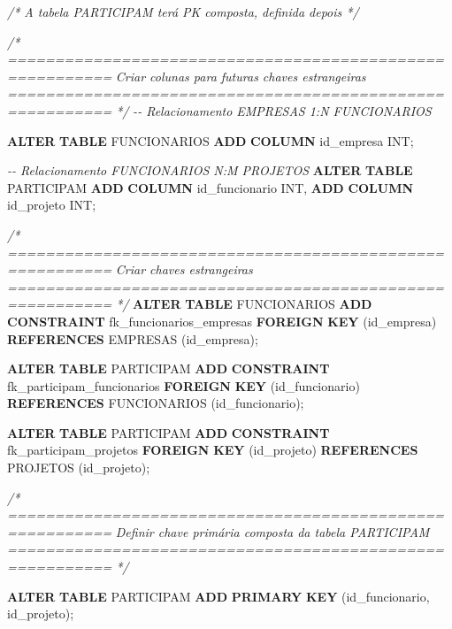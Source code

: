 \documentclass[
]{book}
\newenvironment{Shaded}{\begin{snugshade}}{\end{snugshade}}
\newcommand{\CommentTok}[1]{\textcolor[rgb]{0.56,0.35,0.01}{\textit{#1}}}
\newcommand{\DataTypeTok}[1]{\textcolor[rgb]{0.13,0.29,0.53}{#1}}
\newcommand{\KeywordTok}[1]{\textcolor[rgb]{0.13,0.29,0.53}{\textbf{#1}}}
\newcommand{\NormalTok}[1]{#1}
\begin{document}
\begin{Shaded}
\begin{Highlighting}[]
\CommentTok{/* A tabela PARTICIPAM terá PK composta, definida depois */}

\CommentTok{/* =========================================================}
\CommentTok{   Criar colunas para futuras chaves estrangeiras}
\CommentTok{   ========================================================= */}
\CommentTok{{-}{-} Relacionamento EMPRESAS 1:N FUNCIONARIOS}

\KeywordTok{ALTER} \KeywordTok{TABLE}\NormalTok{ FUNCIONARIOS  }\KeywordTok{ADD} \KeywordTok{COLUMN}\NormalTok{ id\_empresa }\DataTypeTok{INT}\NormalTok{;}

\CommentTok{{-}{-} Relacionamento FUNCIONARIOS N:M PROJETOS}
\KeywordTok{ALTER} \KeywordTok{TABLE}\NormalTok{ PARTICIPAM }\KeywordTok{ADD} \KeywordTok{COLUMN}\NormalTok{ id\_funcionario }\DataTypeTok{INT}\NormalTok{, }\KeywordTok{ADD} \KeywordTok{COLUMN}\NormalTok{ id\_projeto }\DataTypeTok{INT}\NormalTok{;}

\CommentTok{/* =========================================================}
\CommentTok{   Criar chaves estrangeiras}
\CommentTok{   ========================================================= */}
\KeywordTok{ALTER} \KeywordTok{TABLE}\NormalTok{ FUNCIONARIOS }\KeywordTok{ADD} \KeywordTok{CONSTRAINT}\NormalTok{ fk\_funcionarios\_empresas }\KeywordTok{FOREIGN} \KeywordTok{KEY}\NormalTok{ (id\_empresa) }\KeywordTok{REFERENCES}\NormalTok{ EMPRESAS (id\_empresa);}

\KeywordTok{ALTER} \KeywordTok{TABLE}\NormalTok{ PARTICIPAM }\KeywordTok{ADD} \KeywordTok{CONSTRAINT}\NormalTok{ fk\_participam\_funcionarios }\KeywordTok{FOREIGN} \KeywordTok{KEY}\NormalTok{ (id\_funcionario) }\KeywordTok{REFERENCES}\NormalTok{ FUNCIONARIOS (id\_funcionario);}

\KeywordTok{ALTER} \KeywordTok{TABLE}\NormalTok{ PARTICIPAM }\KeywordTok{ADD} \KeywordTok{CONSTRAINT}\NormalTok{ fk\_participam\_projetos }\KeywordTok{FOREIGN} \KeywordTok{KEY}\NormalTok{ (id\_projeto) }\KeywordTok{REFERENCES}\NormalTok{ PROJETOS (id\_projeto);}

\CommentTok{/* =========================================================}
\CommentTok{   Definir chave primária composta da tabela PARTICIPAM}
\CommentTok{   ========================================================= */}

\KeywordTok{ALTER} \KeywordTok{TABLE}\NormalTok{ PARTICIPAM }\KeywordTok{ADD} \KeywordTok{PRIMARY} \KeywordTok{KEY}\NormalTok{ (id\_funcionario, id\_projeto);}
\end{Highlighting}
\end{Shaded}
\end{document}
